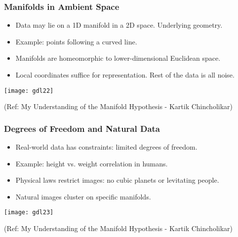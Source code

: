 \begin{frame}[fragile]\frametitle{Manifolds in Ambient Space}
    \begin{itemize}
        \item Data may lie on a 1D manifold in a 2D space. Underlying geometry.
        \item Example: points following a curved line.
        \item Manifolds are homeomorphic to lower-dimensional Euclidean space.
        \item Local coordinates suffice for representation. Rest of the data is all noise.
    \end{itemize}
	
\begin{center}
\texttt{[image: gdl22]}

{\tiny (Ref: My Understanding of the Manifold Hypothesis - Kartik Chincholikar)}	

\end{center}
\end{frame}

\begin{frame}[fragile]\frametitle{Degrees of Freedom and Natural Data}
    \begin{itemize}
        \item Real-world data has constraints: limited degrees of freedom.
        \item Example: height vs. weight correlation in humans.
        \item Physical laws restrict images: no cubic planets or levitating people.
        \item Natural images cluster on specific manifolds.
    \end{itemize}
	
\begin{center}
\texttt{[image: gdl23]}

{\tiny (Ref: My Understanding of the Manifold Hypothesis - Kartik Chincholikar)}	

\end{center}	
\end{frame}

